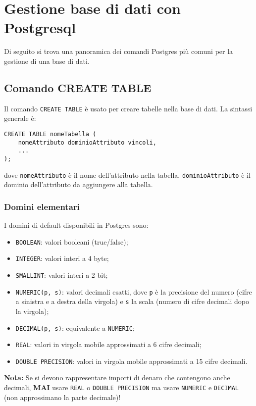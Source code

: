 \documentclass[a4paper, 10pt, titlepage]{article}
\begin{document}
	\begin{frontespizio}
		\Preambolo{\usepackage{datetime}}
	\end{frontespizio}

	\tableofcontents
		
	\newpage
	
	\section{Gestione base di dati con Postgresql}
	Di seguito si trova una panoramica dei comandi Postgres più comuni per la gestione di una base di dati.
	
	\subsection{Comando CREATE TABLE}
	Il comando \lstinline{CREATE TABLE} è usato per creare tabelle nella base di dati.
	La sintassi generale è:
	\begin{lstlisting}
CREATE TABLE nomeTabella (
	nomeAttributo dominioAttributo vincoli,
	...
);
	\end{lstlisting}
	dove \lstinline|nomeAttributo| è il nome dell'attributo nella tabella, \lstinline|dominioAttributo| è il dominio dell'attributo da aggiungere alla tabella.
	
	\subsubsection{Domini elementari}
	I domini di default disponibili in Postgres sono:
	\begin{itemize}
		\item \lstinline|BOOLEAN|: valori booleani (true/false);
		\item \lstinline|INTEGER|: valori interi a 4 byte;
		\item \lstinline|SMALLINT|: valori interi a 2 bit;
		\item \lstinline|NUMERIC(p, s)|: valori decimali esatti, dove \lstinline|p| è la precisione del numero (cifre a sinistra e a destra della virgola) e \lstinline|s| la scala (numero di cifre decimali dopo la virgola);
		\item \lstinline|DECIMAL(p, s)|: equivalente a \lstinline|NUMERIC|;
		\item \lstinline|REAL|: valori in virgola mobile approssimati a 6 cifre decimali;
		\item \lstinline|DOUBLE PRECISION|: valori in virgola mobile approssimati a 15 cifre decimali.
	\end{itemize}
	\textbf{Nota:} Se si devono rappresentare importi di denaro che contengono anche
	decimali, \textbf{MAI} usare \lstinline|REAL| o \lstinline|DOUBLE PRECISION| ma usare \lstinline|NUMERIC| e \lstinline|DECIMAL| (non approssimano la parte decimale)!
\end{document}
